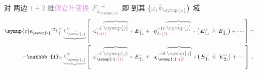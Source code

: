 对  两边 \textcolor{gray}{$1+2$ 维}\textcolor{Plum}{傅立叶变换} $\mathcolor{gray}{\mathcal F_{\bar{k}_{\symup{\rho}}}^{-\omega}}$ 即  到其 $\left( \mathcolor{gray}{\omega}, \mathcolor{gray}{\bar{k}_{\symup{\rho}}} \right)$ 域
\begin{subequations}
\begin{align}
	{\symup{c}} \epsilon^{\hphantom{\symup{\iota}}\mathcolor{gray}{\dot{1}}\dot{2}}_{\symup{\iota}} \mathcolor{gray}{k^\nabla_{\dot{1}}} \mathcolor{gray}{\underbrace{k^\nabla_{\;\! \check{\symup{\jmath}}}}} &\left[ \xint{\begin{smallmatrix} ~ \\ {}^{}_{\mathcolor{gray}{-}} \\ ~ \end{smallmatrix}}{13}{\varsigma}^{\;\! \mathcolor{gray}{\omega} \hat{1} \;\! \mathcolor{gray}{\overbrace{\check{\symup{\jmath}}}}}_{\;\! \dot{2} \mathcolor{gray}{z} \textcolor{Maroon}{(1)}} \mathcolor{gray}{*} \xint{\mathcolor{gray}{-}}{295}{E}^{\;\!\mathcolor{gray}{\omega}}_{\;\! \hat{1} \mathcolor{gray}{z}} + \xint{\begin{smallmatrix} ~ \\ {}^{}_{\mathcolor{gray}{-}} \\ ~ \end{smallmatrix}}{17}{\eta}^{\;\! \mathcolor{gray}{\omega} \hat{1} \hat{2} \;\! \mathcolor{gray}{\overbrace{\check{\symup{\jmath}}}}}_{\;\! \dot{2} \mathcolor{gray}{z} \textcolor{Maroon}{(2)}} \mathcolor{gray}{*} \left( \xint{\mathcolor{gray}{-}}{295}{E}^{\;\!\mathcolor{gray}{\omega}}_{\;\! \hat{1} \mathcolor{gray}{z}} ~\mathcolor{gray}{\widetilde \circledast}~ \xint{\mathcolor{gray}{-}}{295}{E}^{\;\!\mathcolor{gray}{\omega}}_{\;\! \hat{2} \mathcolor{gray}{z}} \right) + \cdots \right] \label{eq:wave_wkrho} = \\
	- \mathbb{i} \mathcolor{gray}{\omega} \mathcolor{gray}{\underbrace{k^\nabla_{\;\! \check{\symup{\jmath}}}}} &\left[ \xint{\begin{smallmatrix} ~ \\ {}^{}_{\mathcolor{gray}{-}} \\ ~ \end{smallmatrix}}{16}{\varepsilon}^{\;\! \mathcolor{gray}{\omega} \hat{1} \;\! \mathcolor{gray}{\overbrace{\check{\symup{\jmath}}}}}_{\;\! \symup{\iota} \mathcolor{gray}{z} \textcolor{Maroon}{(1)}} \mathcolor{gray}{*} \xint{\mathcolor{gray}{-}}{295}{E}^{\;\!\mathcolor{gray}{\omega}}_{\;\! \hat{1} \mathcolor{gray}{z}} + ~\xint{{}^{}_{\mathcolor{gray}{-}}}{23}{\chi}^{\;\! \mathcolor{gray}{\omega} \hat{1} \hat{2} \;\! \mathcolor{gray}{\overbrace{\check{\symup{\jmath}}}}}_{\;\! \symup{\iota} \mathcolor{gray}{z} \textcolor{Maroon}{(2)}} \mathcolor{gray}{*} \left( \xint{\mathcolor{gray}{-}}{295}{E}^{\;\!\mathcolor{gray}{\omega}}_{\;\! \hat{1} \mathcolor{gray}{z}} ~\mathcolor{gray}{\widetilde \circledast}~ \xint{\mathcolor{gray}{-}}{295}{E}^{\;\!\mathcolor{gray}{\omega}}_{\;\! \hat{2} \mathcolor{gray}{z}} \right) + \cdots \right]~,
\end{align}
\end{subequations}
